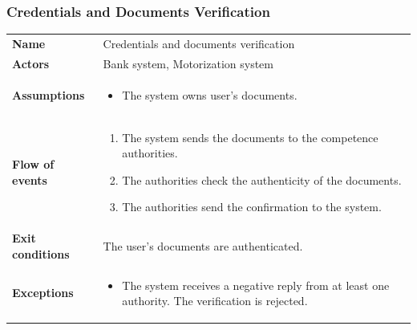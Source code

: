 \documentclass[english]{article}
\begin{document}
		\subsubsection{Credentials and Documents Verification}
		\begin{center}
		\begin{tabular}{l||p{10cm}}
		\textbf{Name} 
			& Credentials and documents verification\\ [8px]
		\textbf{Actors} 
			& Bank system, Motorization system\\ [8px]
		\textbf{Assumptions} 
			& \begin{itemize}
				\item The system owns user's documents.
			\end{itemize}\\
		\textbf{Flow of events}
			& \begin{enumerate}
	 			\item The system sends the documents to the competence authorities.
				\item The authorities check the authenticity of the documents.
				\item The authorities send the confirmation to the system.
			\end{enumerate}\\ 
		\textbf{Exit conditions}
			& The user's documents are authenticated.\\ [8px]
		\textbf{Exceptions}
			& \begin{itemize}
				\item The system receives a negative reply from at least one authority. The verification is rejected.
			\end{itemize}
		\end{tabular}
		\end{center}
		\vspace*{\fill}
		\noindent
\end{document}
